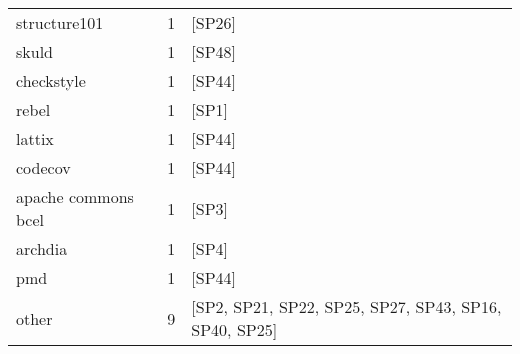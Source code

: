 \begin{tabular}{lrl}
        structure101 &      1 &                                                 [SP26] \\
               skuld &      1 &                                                 [SP48] \\
          checkstyle &      1 &                                                 [SP44] \\
               rebel &      1 &                                                  [SP1] \\
              lattix &      1 &                                                 [SP44] \\
             codecov &      1 &                                                 [SP44] \\
 apache commons bcel &      1 &                                                  [SP3] \\
             archdia &      1 &                                                  [SP4] \\
                 pmd &      1 &                                                 [SP44] \\
               other &      9 &  [SP2, SP21, SP22, SP25, SP27, SP43, SP16, SP40, SP25] \\
\bottomrule
\end{tabular}
